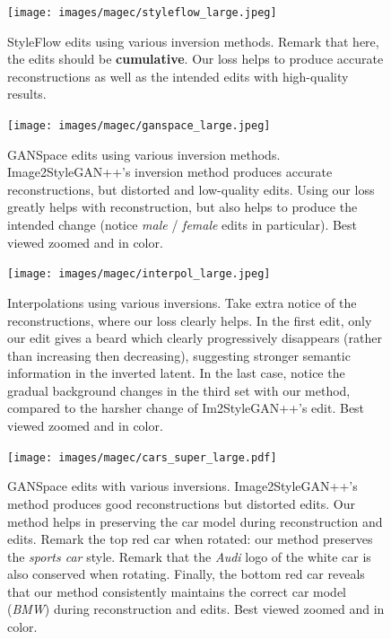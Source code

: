   \begin{figure}
    \centering
      \texttt{[image: images/magec/styleflow\_large.jpeg]}
      \caption{StyleFlow \citep{abdal2020styleflow} edits using various inversion methods. Remark that here, the edits should be \textbf{cumulative}. Our \magec loss helps to produce accurate reconstructions as well as the intended edits with high-quality results.}
      \label{fig:styleflow_supp}
  \end{figure}
  
  \begin{figure}
    \centering
      \texttt{[image: images/magec/ganspace\_large.jpeg]}
      \caption{GANSpace \citep{harkonen2020ganspace} edits using various inversion methods. Image2StyleGAN++'s inversion method produces accurate reconstructions, but distorted and low-quality edits. Using our \magec loss greatly helps with reconstruction, but also helps to produce the intended change (notice \emph{male} / \emph{female} edits in particular). Best viewed zoomed and in color.}
      \label{fig:ganspace_sup}
  \end{figure}
  
  \begin{figure}
    \centering
      \texttt{[image: images/magec/interpol\_large.jpeg]}
      \caption{Interpolations \citep{karra2019stylegan} using various inversions. Take extra notice of the reconstructions, where our \magec loss clearly helps. In the first edit, only our edit gives a beard which clearly progressively disappears (rather than increasing then decreasing), suggesting stronger semantic information in the inverted latent. In the last case, notice the gradual background changes in the third set with our method, compared to the harsher change of Im2StyleGAN++'s edit.  Best viewed zoomed and in color.}
      \label{fig:interpol_sup}
  \end{figure}
  
  \begin{figure}
    \centering
      \texttt{[image: images/magec/cars\_super\_large.pdf]}
      \caption{GANSpace \citep{harkonen2020ganspace} edits with various inversions. Image2StyleGAN++'s method produces good reconstructions but distorted edits. Our method helps in preserving the car model during reconstruction and edits. Remark the top red car when rotated: our method preserves the \emph{sports car} style. Remark that the \emph{Audi} logo of the white car is also conserved when rotating. Finally, the bottom red car reveals that our method consistently maintains the correct car model (\emph{BMW}) during reconstruction and edits. Best viewed zoomed and in color.}
      \label{fig:cars}
  \end{figure}

